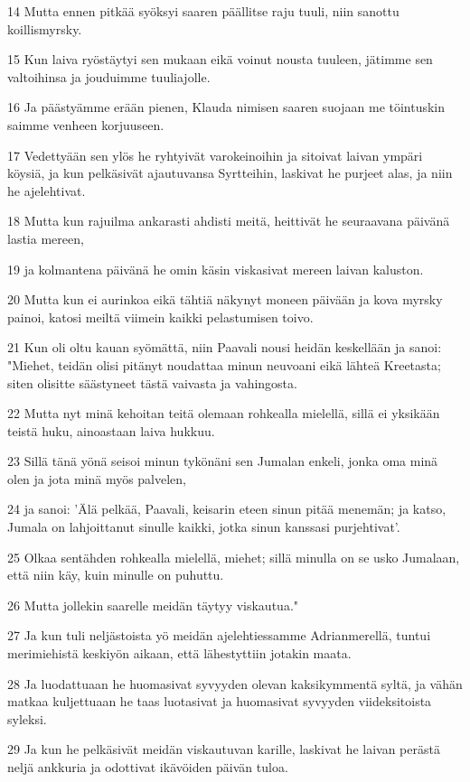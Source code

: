 \par 14 Mutta ennen pitkää syöksyi saaren päällitse raju tuuli, niin sanottu koillismyrsky.
\par 15 Kun laiva ryöstäytyi sen mukaan eikä voinut nousta tuuleen, jätimme sen valtoihinsa ja jouduimme tuuliajolle.
\par 16 Ja päästyämme erään pienen, Klauda nimisen saaren suojaan me töintuskin saimme venheen korjuuseen.
\par 17 Vedettyään sen ylös he ryhtyivät varokeinoihin ja sitoivat laivan ympäri köysiä, ja kun pelkäsivät ajautuvansa Syrtteihin, laskivat he purjeet alas, ja niin he ajelehtivat.
\par 18 Mutta kun rajuilma ankarasti ahdisti meitä, heittivät he seuraavana päivänä lastia mereen,
\par 19 ja kolmantena päivänä he omin käsin viskasivat mereen laivan kaluston.
\par 20 Mutta kun ei aurinkoa eikä tähtiä näkynyt moneen päivään ja kova myrsky painoi, katosi meiltä viimein kaikki pelastumisen toivo.
\par 21 Kun oli oltu kauan syömättä, niin Paavali nousi heidän keskellään ja sanoi: "Miehet, teidän olisi pitänyt noudattaa minun neuvoani eikä lähteä Kreetasta; siten olisitte säästyneet tästä vaivasta ja vahingosta.
\par 22 Mutta nyt minä kehoitan teitä olemaan rohkealla mielellä, sillä ei yksikään teistä huku, ainoastaan laiva hukkuu.
\par 23 Sillä tänä yönä seisoi minun tykönäni sen Jumalan enkeli, jonka oma minä olen ja jota minä myös palvelen,
\par 24 ja sanoi: 'Älä pelkää, Paavali, keisarin eteen sinun pitää menemän; ja katso, Jumala on lahjoittanut sinulle kaikki, jotka sinun kanssasi purjehtivat'.
\par 25 Olkaa sentähden rohkealla mielellä, miehet; sillä minulla on se usko Jumalaan, että niin käy, kuin minulle on puhuttu.
\par 26 Mutta jollekin saarelle meidän täytyy viskautua."
\par 27 Ja kun tuli neljästoista yö meidän ajelehtiessamme Adrianmerellä, tuntui merimiehistä keskiyön aikaan, että lähestyttiin jotakin maata.
\par 28 Ja luodattuaan he huomasivat syvyyden olevan kaksikymmentä syltä, ja vähän matkaa kuljettuaan he taas luotasivat ja huomasivat syvyyden viideksitoista syleksi.
\par 29 Ja kun he pelkäsivät meidän viskautuvan karille, laskivat he laivan perästä neljä ankkuria ja odottivat ikävöiden päivän tuloa.
